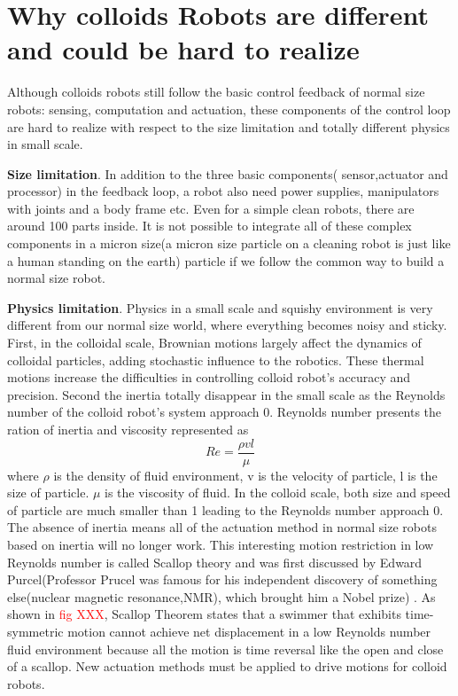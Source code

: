 \section{Why colloids Robots are different and could be hard to realize}
Although colloids robots still follow the basic control feedback of normal size robots: sensing, computation and actuation, these components of the control loop are hard to realize with respect to the size limitation and totally different physics in small scale. 

\textbf{Size limitation}. In addition to the three basic components( sensor,actuator and processor) in the feedback loop, a robot also need power supplies, manipulators with joints and a body frame etc. Even for a simple clean robots, there are around 100 parts inside. It is not possible to integrate all of these complex components in a micron size(a micron size particle on a cleaning robot is just like a human standing on the earth) particle if we follow the common way to build a normal size robot. 

\textbf{Physics limitation}. Physics in a small scale and squishy  environment is very different from our normal size world, where everything becomes noisy and sticky. First, in the colloidal scale, Brownian motions largely affect the dynamics of colloidal particles, adding stochastic influence to the robotics. These thermal motions increase the difficulties in controlling colloid robot's accuracy and precision. Second the inertia totally disappear in the small scale as the Reynolds number of the colloid robot's system approach 0.  Reynolds number presents the ration of inertia and viscosity represented as
\begin{equation}
    Re=\frac{\rho v l}{\mu}
\end{equation}
where $\rho $ is the density of fluid environment, v is the velocity of particle, l is the size of particle. $\mu$ is the  viscosity of fluid. In the colloid scale, both size and speed of particle are much smaller than 1 leading to the Reynolds number approach 0. The absence of inertia means all of the actuation method in normal size robots based on inertia will no longer work. This interesting  motion restriction in low Reynolds number is called Scallop
theory and was first discussed by Edward Purcel(Professor Prucel was famous for his independent discovery of something else(nuclear magnetic resonance,NMR), which brought him a Nobel prize) \cite{purcell1977life}. As shown in \textcolor{red}{fig XXX},  Scallop Theorem states that a swimmer that exhibits time-symmetric motion cannot achieve net displacement in a low Reynolds number fluid environment because all the motion is time reversal like the open and close of a scallop. New actuation methods must be applied to drive motions for colloid robots.

